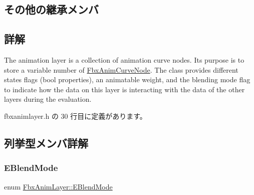 \subsection*{その他の継承メンバ}


\subsection{詳解}
The animation layer is a collection of animation curve nodes. Its purpose is to store a variable number of \hyperlink{class_fbx_anim_curve_node}{Fbx\+Anim\+Curve\+Node}. The class provides different states flags (bool properties), an animatable weight, and the blending mode flag to indicate how the data on this layer is interacting with the data of the other layers during the evaluation. 

 fbxanimlayer.\+h の 30 行目に定義があります。



\subsection{列挙型メンバ詳解}
\mbox{\label{class_fbx_anim_layer_abb1e650203e91ff090773239994e802a}} 
\subsubsection{\texorpdfstring{E\+Blend\+Mode}{EBlendMode}}
{\footnotesize\ttfamily enum \hyperlink{class_fbx_anim_layer_abb1e650203e91ff090773239994e802a}{Fbx\+Anim\+Layer\+::\+E\+Blend\+Mode}}

